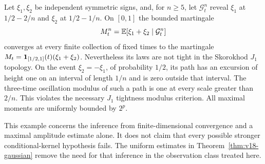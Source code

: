\begin{example}
\label{ex:v18-fiditightness}
Let $\xi_1,\xi_2$ be independent symmetric signs, and, for $n\ge5$, let
$\mathcal G_t^n$ reveal $\xi_1$ at $1/2-2/n$ and $\xi_2$ at $1/2-1/n$.
On $[0,1]$ the bounded martingale
\[
 M_t^n=\mathbb E[\xi_1+\xi_2\mid\mathcal G_t^n]
\]
converges at every finite collection of fixed times to the martingale
$M_t=\mathbf 1_{[1/2,1]}(t)(\xi_1+\xi_2)$. Nevertheless its laws are not tight
in the Skorokhod $J_1$ topology. On the event $\xi_2=-\xi_1$, of probability
$1/2$, its path has an excursion of height one on an interval of length
$1/n$ and is zero outside that interval. The three-time oscillation modulus
of such a path is one at every scale greater than $2/n$. This violates the
necessary $J_1$ tightness modulus criterion. All maximal moments are
uniformly bounded by $2^p$.

This example concerns the inference from finite-dimensional convergence
and a maximal amplitude estimate alone. It does not claim that every
possible stronger conditional-kernel hypothesis fails. The uniform
estimates in Theorem~\ref{thm:v18-gaussian} remove the need for that
inference in the observation class treated here.
\end{example}
